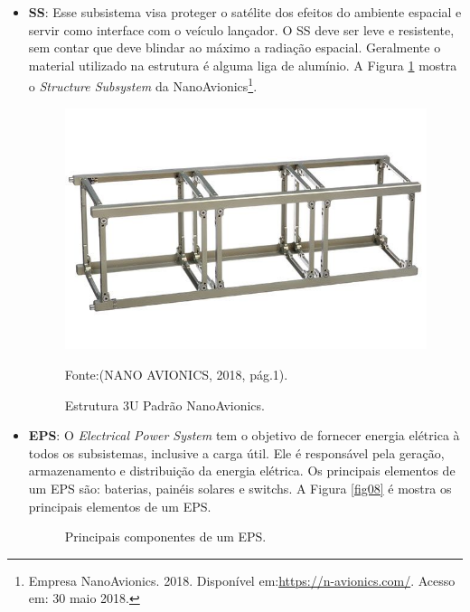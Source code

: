 \begin{itemize}

	\item \textbf{SS}: Esse subsistema visa proteger o satélite dos efeitos do ambiente espacial e servir como interface com o veículo lançador. O SS deve ser leve e resistente, sem contar que deve blindar ao máximo a radiação espacial. Geralmente o material utilizado na estrutura é alguma liga de alumínio.  A Figura \ref{fig07} mostra o \textit{Structure Subsystem} da NanoAvionics\footnote{Empresa NanoAvionics. 2018. Disponível em:\url{https://n-avionics.com/}. Acesso em: 30 maio 2018.}.

\begin{figure}[h]
	\centering
    \caption{Estrutura 3U Padrão NanoAvionics.}
    
	\includegraphics[keepaspectratio=true,scale=0.4]{figuras/cubesat-structure-main.jpg}
	
	Fonte:(NANO AVIONICS, 2018, pág.1).\linebreak
	
	\label{fig07}
\end{figure}

	\item \textbf{EPS}: O \textit{Electrical Power System} tem o objetivo de fornecer energia elétrica à todos os subsistemas, inclusive a carga útil. Ele é responsável pela geração, armazenamento e distribuição da energia elétrica. Os principais elementos de um EPS são: baterias, painéis solares e switchs. A Figura \ref{fig08} é mostra os principais elementos de um EPS.
    
\begin{figure}[h]
	\centering
    \caption{Principais componentes de um EPS.}
	

\end{figure}
\end{itemize}
